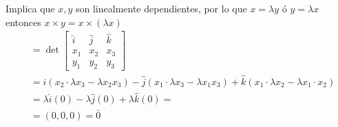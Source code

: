 \begin{exercise}[$x\times y=0\longleftrightarrow x,y$ Son linealmente dependientes]
	Implica que $x,y$ son linealmente dependientes, por lo que $x=\lambda y$ ó $y=\lambda x$
	entonces $x\times y=x\times (\lambda x)$
	\begin{align*}
		 & =\det\begin{bmatrix}
			        \hat{i} & \hat{j} & \hat{k} \\
			        x_1     & x_2     & x_3     \\
			        y_1     & y_2     & y_3
		        \end{bmatrix}                                                                                                                                                   \\
		 & =\hat{i}\left(x_2\cdot \lambda x_3-\lambda x_2 x_3 \right)-\hat{j}\left(x_1\cdot \lambda x_3 -\lambda x_1 x_3\right)+\hat{k}\left(x_1\cdot \lambda x_2-\lambda x_1\cdot x_2\right) \\
		 & =\lambda \hat{i}(0)-\lambda \hat{j}(0)+\lambda\hat{k}(0)=                                                                                                                          \\
		 & =(0,0,0)=\bar{0}
	\end{align*}
\end{exercise}




